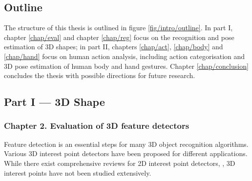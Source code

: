 \subsection{Outline}

The structure of this thesis is outlined in figure \ref{fig/intro/outline}. In part I, chapter \ref{chap/eval} and chapter \ref{chap/reg} focus on the recognition and pose estimation of 3D shapes; in part II, chapters \ref{chap/act}, \ref{chap/body} and \ref{chap/hand} focus on human action analysis, including action categorisation and 3D pose estimation of human body and hand gestures. Chapter \ref{chap/conclusion} concludes the thesis with possible directions for future research. 

\subsection*{Part I --- 3D Shape}


\subsubsection*{Chapter 2. Evaluation of 3D feature detectors} 

Feature detection is an essential steps for many 3D object recognition algorithms. Various 3D interest point detectors have been proposed for different applications. While there exist comprehensive reviews for 2D interest point detectors, \eg \cite{Mikolajczyk2004}, 3D interest points have not been studied extensively. 

